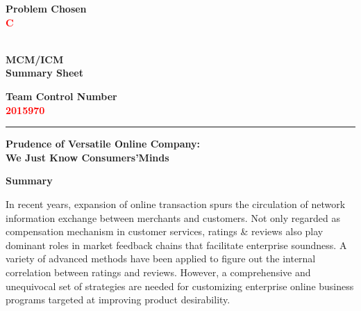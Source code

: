 \documentclass[12pt]{article}%
\newcommand{\headset}{{\Large\the\year}\\MCM/ICM\\Summary Sheet}
\begin{document}
\newpage
\thispagestyle{empty}
\vspace*{-5pc}%
\setmainfont{Times New Roman}

\begin{center}
	\begingroup
	\setlength{\parindent}{0pt}
	\begin{minipage}[t]{0.33\linewidth}
		\bfseries\centering%
		Problem Chosen\\[0.7pc]
		{\Huge\textbf{\textcolor{red}{C}}}\\[2.8pc]
	\end{minipage}%
	\begin{minipage}[t]{0.33\linewidth}
		\centering%
		\textbf{\headset}%
	\end{minipage}%
	\begin{minipage}[t]{0.33\linewidth}
		\centering\bfseries%
		Team Control Number\\[0.7pc]
		{\Huge\textbf{\textcolor{red}{2015970}}}\\[2.8pc]
	\end{minipage}\par
	\vskip 10pt%
	\rule{\linewidth}{1.5pt}\par
	\endgroup
	\vskip 10pt%
\end{center}
\begin{center}
	\vspace{7pt}
	{\normalfont \LARGE \textbf{Prudence of Versatile Online Company:\\ We Just Know Consumers’Minds} }\par
	\par		%
	\vspace{4pt}
	\noindent
	{\textbf{Summary}}
\end{center}


In recent years, expansion of online transaction spurs the circulation of network information exchange between merchants and customers. Not only regarded as compensation mechanism in customer services, ratings \& reviews also play dominant roles in market feedback chains that facilitate enterprise soundness. A variety of advanced methods have been applied to figure out the internal correlation between ratings and reviews. However, a comprehensive and unequivocal set of strategies are needed for customizing enterprise online business programs targeted at improving product desirability.
\end{document}
